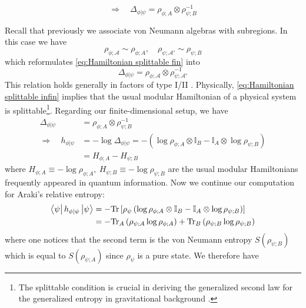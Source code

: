\documentclass[a4paper,11pt]{article}
\newcommand{\diracprod}[3]{\left\langle  #1 \vphantom{#2#3} \right|#2 \left| #3 \vphantom{#1#2} \right\rangle } %
\renewcommand{\=}[1]{\stackrel{#1}{=}} %
\def\A{\mathcal{A}}
\def\Tr{\text{Tr}}
\begin{document}
\begin{equation}\label{eq:Hamiltonian splittable fin}
	\Rightarrow\quad \Delta_{\phi|\psi}=\rho_{\phi;A}\otimes\rho_{\psi;B}^{-1}
\end{equation}

Recall that previously we associate von Neumann algebras with subregions. In this case we have 
\begin{equation}
	\rho_{\phi;\A}\sim \rho_{\phi;A},\quad \rho_{\psi;\A'}\sim \rho_{\psi;B}
\end{equation}
which reformulates \eqref{eq:Hamiltonian splittable fin} into
\begin{equation}\label{eq:Hamiltonian splittable infin}
	\Delta_{\phi|\psi}=\rho_{\phi;\A}\otimes\rho_{\psi;\A'}^{-1}
\end{equation}
This relation holds generally in factors of type I/II \cite{Chandrasekaran:2022eqq}. Physically, \eqref{eq:Hamiltonian splittable infin} implies that the usual modular Hamiltonian of a physical system is splittable\footnote{The splittable condition is crucial in deriving the generalized second law for the generalized entropy in gravitational background \cite{Jensen:2023yxy}.}. Regarding our finite-dimensional setup, we have
\begin{equation}
	\begin{aligned}
		\Delta_{\phi|\psi}&=\rho_{\phi;A}\otimes\rho_{\psi;B}^{-1}\\
		\Rightarrow\quad h_{\phi|\psi}&=-\log \Delta_{\phi|\psi}=-\left(\log\rho_{\phi;A}\otimes\mathbb{I}_B-\mathbb{I}_A\otimes \log\rho_{\psi;B}\right)\\
		&=H_{\phi;A}-H_{\psi;B}
	\end{aligned}
\end{equation}
where $H_{\phi;A}\equiv -\log\rho_{\phi;A},~H_{\psi;B}\equiv -\log\rho_{\psi;B}$ are the usual modular Hamiltonians frequently appeared in quantum information. Now we continue our computation for Araki's relative entropy:
\begin{equation}
	\begin{aligned}
		\diracprod{\psi}{h_{\phi|\psi}}{\psi}&=-\Tr\left[\rho_{\psi}\left(\log\rho_{\phi;A}\otimes\mathbb{I}_B-\mathbb{I}_A\otimes \log\rho_{\psi;B}\right)\right]\\
		&=-\Tr_A\left(\rho_{\psi;A}\log\rho_{\phi;A}\right)+\Tr_B\left(\rho_{\psi;B}\log\rho_{\psi;B}\right)
	\end{aligned}
\end{equation}
where one notices that the second term is the von Neumann entropy $S(\rho_{\psi;B})$ which is equal to $S(\rho_{\psi;A})$ since $\rho_{\psi}$ is a pure state. We therefore have
\end{document}
